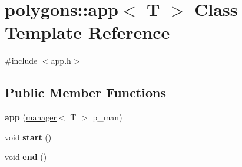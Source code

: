 \hypertarget{classpolygons_1_1app}{\section{polygons\-:\-:app$<$ T $>$ Class Template Reference}
\label{classpolygons_1_1app}
}


{\ttfamily \#include $<$app.\-h$>$}

\subsection*{Public Member Functions}
\begin{DoxyCompactItemize}
\item 
\hypertarget{classpolygons_1_1app_aff6d276cee6e502fa086aeb1ce4ad2f8}{{\bfseries app} (\hyperlink{classpolygons_1_1manager}{manager}$<$ T $>$ p\-\_\-man)}\label{classpolygons_1_1app_aff6d276cee6e502fa086aeb1ce4ad2f8}

\item 
\hypertarget{classpolygons_1_1app_ae88f2d95274e77881443122ca42a1cd0}{void {\bfseries start} ()}\label{classpolygons_1_1app_ae88f2d95274e77881443122ca42a1cd0}

\item 
\hypertarget{classpolygons_1_1app_a6d7381dafd5d79a0b8f8a945601521f9}{void {\bfseries end} ()}\label{classpolygons_1_1app_a6d7381dafd5d79a0b8f8a945601521f9}

\end{DoxyCompactItemize}
